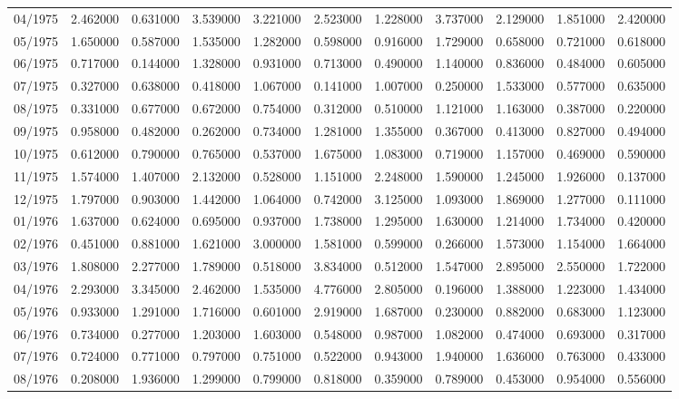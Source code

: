\begin{tabular}{lrrrrrrrrrr}
04/1975 & 2.462000 & 0.631000 & 3.539000 & 3.221000 & 2.523000 & 1.228000 & 3.737000 & 2.129000 & 1.851000 & 2.420000 \\
05/1975 & 1.650000 & 0.587000 & 1.535000 & 1.282000 & 0.598000 & 0.916000 & 1.729000 & 0.658000 & 0.721000 & 0.618000 \\
06/1975 & 0.717000 & 0.144000 & 1.328000 & 0.931000 & 0.713000 & 0.490000 & 1.140000 & 0.836000 & 0.484000 & 0.605000 \\
07/1975 & 0.327000 & 0.638000 & 0.418000 & 1.067000 & 0.141000 & 1.007000 & 0.250000 & 1.533000 & 0.577000 & 0.635000 \\
08/1975 & 0.331000 & 0.677000 & 0.672000 & 0.754000 & 0.312000 & 0.510000 & 1.121000 & 1.163000 & 0.387000 & 0.220000 \\
09/1975 & 0.958000 & 0.482000 & 0.262000 & 0.734000 & 1.281000 & 1.355000 & 0.367000 & 0.413000 & 0.827000 & 0.494000 \\
10/1975 & 0.612000 & 0.790000 & 0.765000 & 0.537000 & 1.675000 & 1.083000 & 0.719000 & 1.157000 & 0.469000 & 0.590000 \\
11/1975 & 1.574000 & 1.407000 & 2.132000 & 0.528000 & 1.151000 & 2.248000 & 1.590000 & 1.245000 & 1.926000 & 0.137000 \\
12/1975 & 1.797000 & 0.903000 & 1.442000 & 1.064000 & 0.742000 & 3.125000 & 1.093000 & 1.869000 & 1.277000 & 0.111000 \\
01/1976 & 1.637000 & 0.624000 & 0.695000 & 0.937000 & 1.738000 & 1.295000 & 1.630000 & 1.214000 & 1.734000 & 0.420000 \\
02/1976 & 0.451000 & 0.881000 & 1.621000 & 3.000000 & 1.581000 & 0.599000 & 0.266000 & 1.573000 & 1.154000 & 1.664000 \\
03/1976 & 1.808000 & 2.277000 & 1.789000 & 0.518000 & 3.834000 & 0.512000 & 1.547000 & 2.895000 & 2.550000 & 1.722000 \\
04/1976 & 2.293000 & 3.345000 & 2.462000 & 1.535000 & 4.776000 & 2.805000 & 0.196000 & 1.388000 & 1.223000 & 1.434000 \\
05/1976 & 0.933000 & 1.291000 & 1.716000 & 0.601000 & 2.919000 & 1.687000 & 0.230000 & 0.882000 & 0.683000 & 1.123000 \\
06/1976 & 0.734000 & 0.277000 & 1.203000 & 1.603000 & 0.548000 & 0.987000 & 1.082000 & 0.474000 & 0.693000 & 0.317000 \\
07/1976 & 0.724000 & 0.771000 & 0.797000 & 0.751000 & 0.522000 & 0.943000 & 1.940000 & 1.636000 & 0.763000 & 0.433000 \\
08/1976 & 0.208000 & 1.936000 & 1.299000 & 0.799000 & 0.818000 & 0.359000 & 0.789000 & 0.453000 & 0.954000 & 0.556000 \\

\end{tabular}
